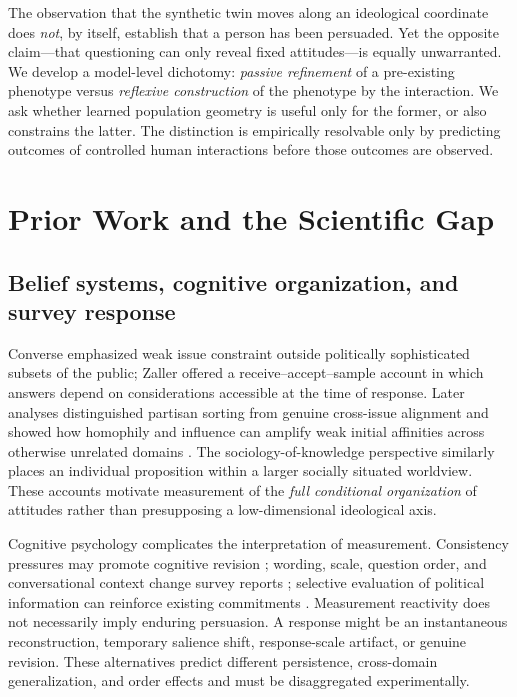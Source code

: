 \documentclass[journal,10pt]{IEEEtran}
\begin{document}
The observation that the synthetic twin moves along an ideological coordinate does \emph{not}, by itself, establish that a person has been persuaded. Yet the opposite claim---that questioning can only reveal fixed attitudes---is equally unwarranted. We develop a model-level dichotomy: \emph{passive refinement} of a pre-existing phenotype versus \emph{reflexive construction} of the phenotype by the interaction. We ask whether learned population geometry is useful only for the former, or also constrains the latter. The distinction is empirically resolvable only by predicting outcomes of controlled human interactions before those outcomes are observed.

\section{Prior Work and the Scientific Gap}
\subsection{Belief systems, cognitive organization, and survey response}
Converse \cite{converse1964} emphasized weak issue constraint outside politically sophisticated subsets of the public; Zaller \cite{zaller1992} offered a receive--accept--sample account in which answers depend on considerations accessible at the time of response. Later analyses distinguished partisan sorting from genuine cross-issue alignment \cite{baldassarri2008} and showed how homophily and influence can amplify weak initial affinities across otherwise unrelated domains \cite{dellaposta2015}. The sociology-of-knowledge perspective similarly places an individual proposition within a larger socially situated worldview. These accounts motivate measurement of the \emph{full conditional organization} of attitudes rather than presupposing a low-dimensional ideological axis.

Cognitive psychology complicates the interpretation of measurement. Consistency pressures may promote cognitive revision \cite{festinger1957}; wording, scale, question order, and conversational context change survey reports \cite{schwarz1999}; selective evaluation of political information can reinforce existing commitments \cite{taber2006}. Measurement reactivity does not necessarily imply enduring persuasion. A response might be an instantaneous reconstruction, temporary salience shift, response-scale artifact, or genuine revision. These alternatives predict different persistence, cross-domain generalization, and order effects and must be disaggregated experimentally.
\end{document}
